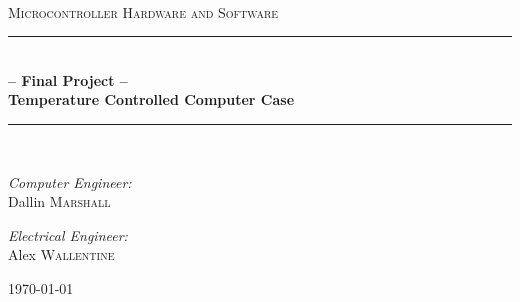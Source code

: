 \documentclass[11pt]{article}
\begin{document}
\newcommand{\HRule}{\rule{\linewidth}{0.5mm}}

\begin{titlepage}
\begin{center}

~\\[4cm]

\textsc{\Large Microcontroller Hardware and Software}\\[0.5cm]

\HRule \\[0.4cm]
{ \huge \bfseries -- Final Project -- \\ Temperature Controlled Computer Case \\[0.4cm] }

\HRule \\[1.5cm]

\noindent
\begin{minipage}{0.4\textwidth}
\begin{flushleft} \large
\emph{Computer Engineer:}\\
Dallin \textsc{Marshall}
\end{flushleft}
\end{minipage}%
\begin{minipage}{0.4\textwidth}
\begin{flushright} \large
\emph{Electrical Engineer:} \\
Alex \textsc{Wallentine}
\end{flushright}
\end{minipage}

\vfill

{\large \today}

\end{center}
\end{titlepage}
\end{document}

